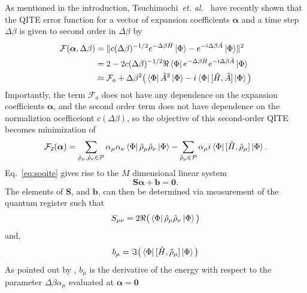 \documentclass[aip,jcp,amsmath,amssymb, reprint]{revtex4-1}
\providecommand{\norm}[1]{\lVert#1\rVert}
\begin{document}
As mentioned in the introduction, Tsuchimochi~\textit{et. al.}~\cite{tsuchimochi2023improved} have recently shown that the QITE error function for a vector of expansion coefficients $\boldsymbol{\alpha}$ and a time step $\Delta \beta$ is given to second order in $\Delta \beta$ by
\begin{equation}
\begin{aligned}
\mathcal{F}(\boldsymbol{\alpha}, \Delta \beta) &= \norm{  c(\Delta \beta)^{-1/2} e^{-\Delta \beta \hat{H} }\ket{\Phi} -  e^{-i \Delta \beta \hat{A}}\ket{\Phi}  }^2 \\
&= 2 - 2 c(\Delta \beta)^{-1/2} \Re \bra{\Phi} e^{-\Delta \beta \hat{H} } e^{-i \Delta \beta \hat{A}} \ket{\Phi} \\
&\approx \mathcal{F}_o + \Delta \beta^2 \big( \bra{\Phi} \hat{A}^2 \ket{\Phi}  - i  \bra{\Phi} [ \hat{H}, \hat{A} ] \ket{\Phi}  \big)
\end{aligned}
\end{equation}
Importantly, the term $\mathcal{F}_o$ does not have any dependence on the expansion coefficients $\boldsymbol{\alpha}$, 
and the second order term does not have dependence on the normaliztion ocefficeiont $c(\Delta \beta)$,
so the objective of this second-order QITE becomes minimization of 
\begin{equation}
\mathcal{F}_2(\boldsymbol{\alpha}) 
= \sum_{\hat{ \rho}_\mu, \hat{ \rho}_\nu \in \mathcal{P}} \alpha_\mu \alpha_\nu \bra{\Phi}  \hat{\rho}_\mu  \hat{\rho}_\nu \ket{\Phi}
- \sum_{\hat{ \rho}_\mu \in \mathcal{P}} \alpha_\mu i \bra{\Phi} [ \hat{H}, \hat{\rho}_\mu ] \ket{\Phi}. 
\label{eq:soqite}
\end{equation}
Eq.~\eqref{eq:soqite} gives rise to the $M$ dimensional linear system 
\begin{equation}
\label{eq:lin_sys}
\mathbf{S}\boldsymbol{\alpha} +\mathbf{b} = \mathbf{0}.
\end{equation}
The elements of $\mathbf{S}$, and $\mathbf{b}$, can then be determined via measurement of the quantum register such that   
\begin{equation}
S_{\mu \nu} = 2 \Re \big( \bra{\Phi} \hat{\rho}_\mu \hat{\rho}_\nu \ket{\Phi} \big)
\end{equation}
and,
\begin{equation}
b_{\mu} = \Im \big( \bra{\Phi}  [ \hat{H}, \hat{\rho}_\mu ]  \ket{\Phi} \big)
\end{equation}
As pointed out by , $b_\mu$ is the derivative of the energy with respect to the parameter $\Delta \beta \alpha_\mu$ evaluated at $\boldsymbol{\alpha} = \mathbf{0}$
\end{document}
